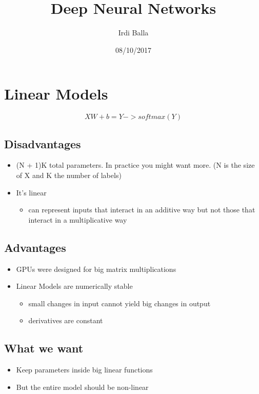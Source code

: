 \documentclass{article}
\title{Deep Neural Networks}
\date{08/10/2017}
\author{Irdi Balla}
\begin{document}
	\maketitle
	\section{Linear Models}
	\begin{equation}
	XW + b = Y -> softmax(Y)	
	\end{equation}
	\subsection{Disadvantages}
	\begin{itemize}
		\item (N + 1)K total parameters. In practice you might want more. (N is the size of X and K the number of labels)
		\item It's linear
		\begin{itemize}
			\item can represent inputs that interact in an additive way but not those that interact in a multiplicative way
		\end{itemize}
	\end{itemize}
	\subsection{Advantages}
	\begin{itemize}
		\item GPUs were designed for big matrix multiplications
		\item Linear Models are numerically stable
		\begin{itemize}
			\item small changes in input cannot yield big changes in output
			\item derivatives are constant
		\end{itemize}
	\end{itemize}
	\subsection{What we want}
		\begin{itemize}
			\item Keep parameters inside big linear functions
			\item But the entire model should be non-linear
		\end{itemize}
	
\end{document}
